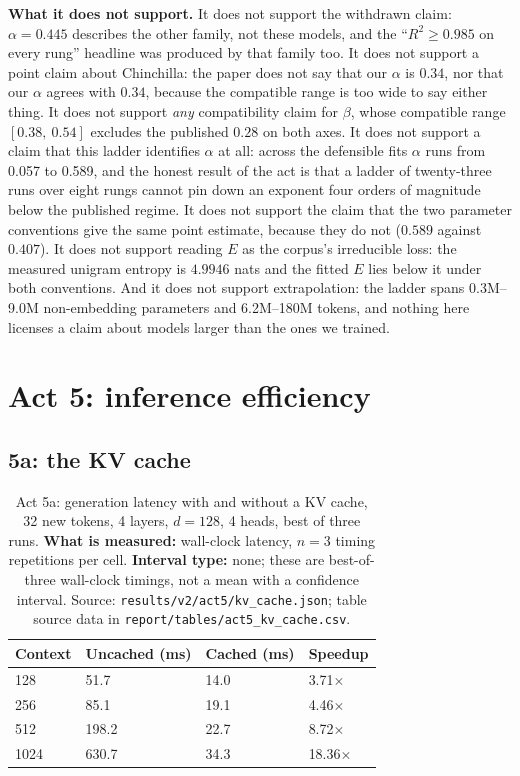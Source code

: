\documentclass[11pt,a4paper]{article}
\begin{document}
\textbf{What it does not support.} It does not support the withdrawn claim:
$\alpha = 0.445$ describes the other family, not these models, and the
``$R^2 \geq 0.985$ on every rung'' headline was produced by that family
too. It does not support a point claim about Chinchilla: the paper does not
say that our $\alpha$ is $0.34$, nor that our $\alpha$ agrees with $0.34$,
because the compatible range is too wide to say either thing. It does not
support \emph{any} compatibility claim for $\beta$, whose compatible range
$[0.38,\ 0.54]$ excludes the published $0.28$ on both axes. It does not
support a claim that this ladder identifies $\alpha$ at all: across
the defensible fits $\alpha$ runs from 0.057 to 0.589, and the honest result of
the act is that a ladder of twenty-three runs over eight rungs cannot pin down
an exponent four orders of magnitude below the published regime. It does not
support the claim that the two parameter conventions give the same point
estimate, because they do not ($0.589$ against $0.407$). It does not support
reading $E$ as the corpus's irreducible loss: the
measured unigram entropy is $4.9946$ nats and the fitted $E$ lies below it
under both conventions. And it does not support extrapolation: the ladder
spans 0.3M--9.0M non-embedding parameters and 6.2M--180M tokens, and
nothing here licenses a claim about models larger than the ones we trained.


\section{Act 5: inference efficiency}
\label{sec:act5}

\subsection{5a: the KV cache}
\label{sec:act5a}

\begin{table}[H]
\centering
\begin{tabular}{L{3.2cm}R{2.6cm}R{2.4cm}R{2.4cm}}
\toprule
Context & Uncached (ms) & Cached (ms) & Speedup \\
 & 51.7 & 14.0 & 3.71$\times$ \\
256 & 85.1 & 19.1 & 4.46$\times$ \\
512 & 198.2 & 22.7 & 8.72$\times$ \\
1024 & 630.7 & 34.3 & 18.36$\times$ \\
\bottomrule
\end{tabular}
\caption{Act 5a: generation latency with and without a KV cache, 32 new tokens,
4 layers, $d = 128$, 4 heads, best of three runs. \textbf{What is measured:}
wall-clock latency, $n = 3$ timing repetitions per cell. \textbf{Interval
type:} none; these are best-of-three wall-clock timings, not a mean with a
confidence interval. Source: \texttt{results/v2/act5/kv\_cache.json}; table
source data in \texttt{report/tables/act5\_kv\_cache.csv}.}
\label{tab:act5a}
\end{table}
\end{document}
